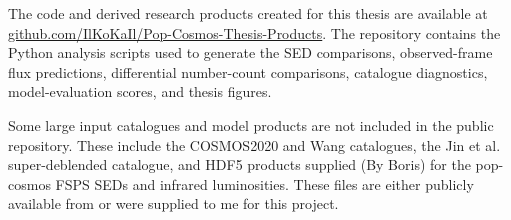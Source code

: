 \documentclass[12pt,a4paper]{article}
\begin{document}
The code and derived research products created for this thesis are available at
\href{https://github.com/IlKoKaIl/Pop-Cosmos-Thesis-Products}
{github.com/IlKoKaIl/Pop-Cosmos-Thesis-Products}. The repository contains the
Python analysis scripts used to generate the SED comparisons, observed-frame
flux predictions, differential number-count comparisons, catalogue diagnostics,
model-evaluation scores, and thesis figures. 

Some large input catalogues and model products are not included in the public
repository. These include the COSMOS2020 and Wang catalogues, the Jin et al.
super-deblended catalogue, and HDF5 products supplied (By Boris) for the pop-cosmos FSPS
SEDs and infrared luminosities. These files are either publicly available from
or were supplied to me for this project.



\end{document}
